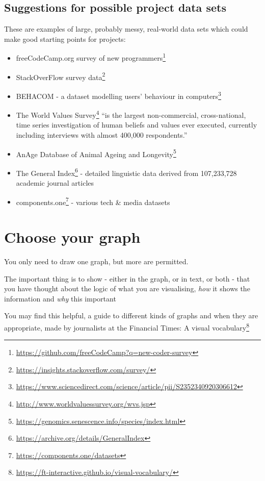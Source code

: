 \documentclass[
  12pt,
  a5paper,
]{book}
\DeclareRobustCommand{\href}[2]{#2\footnote{\url{#1}}}
\providecommand{\tightlist}{%
  \setlength{\itemsep}{0pt}\setlength{\parskip}{0pt}}
\begin{document}
\hypertarget{suggestions-for-possible-project-data-sets}{%
\subsection{Suggestions for possible project data sets}\label{suggestions-for-possible-project-data-sets}}

These are examples of large, probably messy, real-world data sets which could make good starting points for projects:

\begin{itemize}
\tightlist
\item
  \href{https://github.com/freeCodeCamp?q=new-coder-survey}{freeCodeCamp.org survey of new programmers}
\item
  \href{https://insights.stackoverflow.com/survey/}{StackOverFlow survey data}
\item
  \href{https://www.sciencedirect.com/science/article/pii/S2352340920306612}{BEHACOM - a dataset modelling users' behaviour in computers}
\item
  The \href{http://www.worldvaluessurvey.org/wvs.jsp}{World Values Survey} ``is the largest non-commercial, cross-national, time series investigation of human beliefs and values ever executed, currently including interviews with almost 400,000 respondents.''
\item
  \href{https://genomics.senescence.info/species/index.html}{AnAge Database of Animal Ageing and Longevity}
\item
  \href{https://archive.org/details/GeneralIndex}{The General Index} - detailed linguistic data derived from 107,233,728 academic journal articles
\item
  \href{https://components.one/datasets}{components.one} - various tech \& media datasets
\end{itemize}

\hypertarget{choose-your-graph}{%
\section{Choose your graph}\label{choose-your-graph}}

You only need to draw one graph, but more are permitted.

The important thing is to show - either in the graph, or in text, or both - that you have thought about the logic of what you are visualising, \emph{how} it shows the information and \emph{why} this important

You may find this helpful, a guide to different kinds of graphs and when they are appropriate, made by journalists at the Financial Times: \href{https://ft-interactive.github.io/visual-vocabulary/}{A visual vocabulary}
\end{document}
